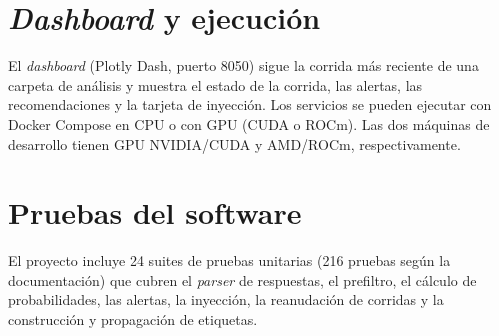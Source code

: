 \section{\textit{Dashboard} y ejecución}\label{sec:met_dashboard}

El \textit{dashboard} (Plotly Dash, puerto 8050) sigue la corrida más reciente de una carpeta de análisis y muestra el estado de la corrida, las alertas, las recomendaciones y la tarjeta de inyección. Los servicios se pueden ejecutar con Docker Compose en CPU o con GPU (CUDA o ROCm). Las dos máquinas de desarrollo tienen GPU NVIDIA/CUDA y AMD/ROCm, respectivamente. %

\section{Pruebas del software}\label{sec:met_pruebas}

El proyecto incluye 24 suites de pruebas unitarias (216 pruebas según la documentación) que cubren el \textit{parser} de respuestas, el prefiltro, el cálculo de probabilidades, las alertas, la inyección, la reanudación de corridas y la construcción y propagación de etiquetas. %
